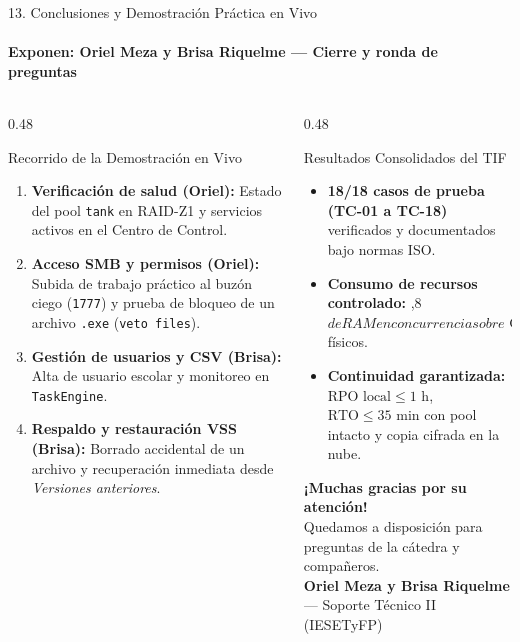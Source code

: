 \documentclass[aspectratio=169,10pt]{beamer}
\begin{document}
\begin{frame}{13. Conclusiones y Demostración Práctica en Vivo}
    \framesubtitle{Exponen: Oriel Meza y Brisa Riquelme — Cierre y ronda de preguntas}
    \begin{columns}[T]
        \begin{column}{0.48\textwidth}
            \begin{block}{Recorrido de la Demostración en Vivo}
                \footnotesize
                \begin{enumerate}
                    \item \textbf{Verificación de salud (Oriel):} Estado del pool \texttt{tank} en RAID-Z1 y servicios activos en el Centro de Control.
                    \item \textbf{Acceso SMB y permisos (Oriel):} Subida de trabajo práctico al buzón ciego (\texttt{1777}) y prueba de bloqueo de un archivo \texttt{.exe} (\texttt{veto files}).
                    \item \textbf{Gestión de usuarios y CSV (Brisa):} Alta de usuario escolar y monitoreo en \texttt{TaskEngine}.
                    \item \textbf{Respaldo y restauración VSS (Brisa):} Borrado accidental de un archivo y recuperación inmediata desde \textit{Versiones anteriores}.
                \end{enumerate}
            \end{block}
        \end{column}
        \begin{column}{0.48\textwidth}
            \begin{exampleblock}{Resultados Consolidados del TIF}
                \footnotesize
                \begin{itemize}
                    \item \textbf{18/18 casos de prueba (TC-01 a TC-18)} verificados y documentados bajo normas ISO.
                    \item \textbf{Consumo de recursos controlado:} ,8$ de RAM en concurrencia sobre \text{ GB}$ físicos.
                    \item \textbf{Continuidad garantizada:} $\text{RPO local} \le 1\text{ h}$, $\text{RTO} \le 35\text{ min}$ con pool intacto y copia cifrada en la nube.
                \end{itemize}
            \end{exampleblock}
            \vspace{0.2cm}
            \centering
            \textbf{\large ¡Muchas gracias por su atención!}\\
            \footnotesize Quedamos a disposición para preguntas de la cátedra y compañeros.\\
            \textbf{Oriel Meza y Brisa Riquelme} — Soporte Técnico II (IESETyFP)
        \end{column}
    \end{columns}
\end{frame}
\end{document}
